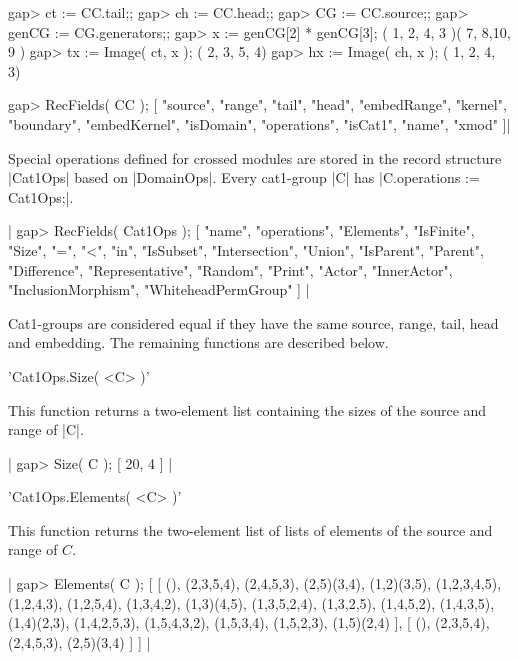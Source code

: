     gap> ct := CC.tail;;
    gap> ch := CC.head;;
    gap> CG := CC.source;;
    gap> genCG := CG.generators;;
    gap> x := genCG[2] * genCG[3];
    ( 1, 2, 4, 3 )( 7, 8,10, 9 )
    gap> tx := Image( ct, x );
    ( 2, 3, 5, 4)
    gap> hx := Image( ch, x );
    ( 1, 2, 4, 3)
    
    gap> RecFields( CC );
    [ "source", "range", "tail", "head", "embedRange", "kernel", 
      "boundary", "embedKernel", "isDomain", "operations", "isCat1",
      "name", "xmod" ]|

%

Special   operations defined for   crossed  modules are stored  in the
record structure |Cat1Ops| based on |DomainOps|.  Every cat1-group |C|
has |C.operations := Cat1Ops;|.

|    gap> RecFields( Cat1Ops );
    [ "name", "operations", "Elements", "IsFinite", "Size", "=", "<", 
      "in", "IsSubset", "Intersection", "Union", "IsParent", "Parent", 
      "Difference", "Representative", "Random", "Print", "Actor",
      "InnerActor", "InclusionMorphism", "WhiteheadPermGroup" ]  |

Cat1-groups are considered equal if  they have the same source, range,
tail,   head  and embedding.  The   remaining  functions are described
below.


%

'Cat1Ops.Size( <C> )'

This function returns  a two-element list  containing the sizes of the
source and range of |C|.

|    gap> Size( C );
     [ 20, 4 ] | 
     
%

'Cat1Ops.Elements( <C> )'

This function returns the two-element list of lists of elements of the
source and range of $C$.


|    gap> Elements( C );
    [ [ (), (2,3,5,4), (2,4,5,3), (2,5)(3,4), (1,2)(3,5), (1,2,3,4,5),
        (1,2,4,3), (1,2,5,4), (1,3,4,2), (1,3)(4,5), (1,3,5,2,4),
        (1,3,2,5), (1,4,5,2), (1,4,3,5), (1,4)(2,3), (1,4,2,5,3), 
        (1,5,4,3,2), (1,5,3,4), (1,5,2,3), (1,5)(2,4) ],
      [ (), (2,3,5,4), (2,4,5,3), (2,5)(3,4) ] ]  |

